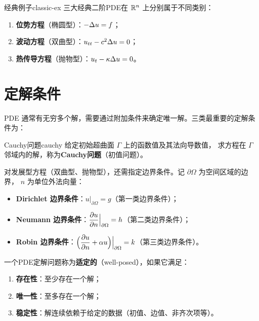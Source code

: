 \documentclass[11pt,a4paper,openany,oneside]{ctexbook}
\begin{document}
\begin{example}{经典例子}{classic-ex}
  三大经典二阶PDE在 $\mathbb{R}^{n}$ 上分别属于不同类别：
  \begin{enumerate}[label=(\roman*)]
    \item \textbf{位势方程}（椭圆型）：$-\Delta u=f$；
    \item \textbf{波动方程}（双曲型）：$u_{tt}-c^{2}\Delta u=0$；
    \item \textbf{热传导方程}（抛物型）：$u_{t}-\kappa\Delta u=0$。
  \end{enumerate}
\end{example}

\section{定解条件}

PDE 通常有无穷多个解，需要通过附加条件来确定唯一解。三类最重要的定解条件为：

\begin{definition}{Cauchy问题}{cauchy}
  给定初始超曲面 $\Gamma$ 上的函数值及其法向导数值，
  求方程在 $\Gamma$ 邻域内的解，称为\textbf{Cauchy问题}（初值问题）。
\end{definition}

对发展型方程（双曲型、抛物型），还需指定边界条件。记 $\partial\Omega$ 为空间区域的边界，
$n$ 为单位外法向量：

\begin{itemize}
  \item \textbf{Dirichlet 边界条件}：$u\big|_{\partial\Omega}=g$（第一类边界条件）；
  \item \textbf{Neumann 边界条件}：$\displaystyle\frac{\partial u}{\partial n}\Big|_{\partial\Omega}=h$（第二类边界条件）；
  \item \textbf{Robin 边界条件}：$\displaystyle\Bigl(\frac{\partial u}{\partial n}+\alpha u\Bigr)\Big|_{\partial\Omega}=k$（第三类边界条件）。
\end{itemize}

\begin{keyeq}
  一个PDE定解问题称为\textbf{适定的}（well-posed），如果它满足：
  \begin{enumerate}[label=(\alph*)]
    \item \textbf{存在性}：至少存在一个解；
    \item \textbf{唯一性}：至多存在一个解；
    \item \textbf{稳定性}：解连续依赖于给定的数据（初值、边值、非齐次项等）。
  \end{enumerate}
\end{keyeq}
\end{document}
